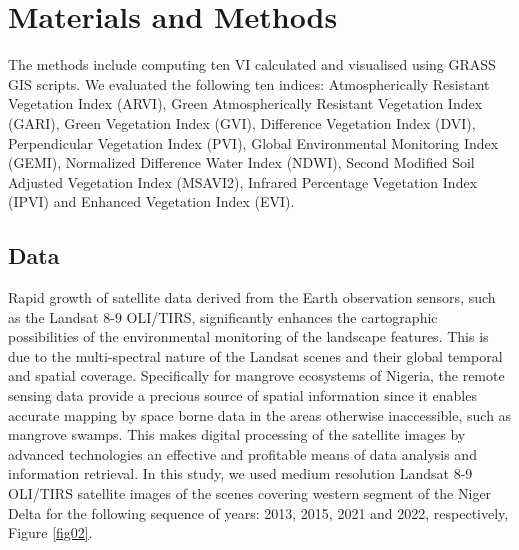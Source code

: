 \documentclass[jmse,article,submit,pdftex,moreauthors]{Definitions/mdpi}
\begin{document}
\section{Materials and Methods}

The methods include computing ten VI calculated and visualised using GRASS GIS scripts. We evaluated the following ten indices: Atmospherically Resistant Vegetation Index (ARVI), Green Atmospherically Resistant Vegetation Index (GARI), Green Vegetation Index (GVI), Difference Vegetation Index (DVI), Perpendicular Vegetation Index (PVI), Global Environmental Monitoring Index (GEMI), Normalized Difference Water Index (NDWI), Second Modified Soil Adjusted Vegetation Index (MSAVI2), Infrared Percentage Vegetation Index (IPVI) and Enhanced Vegetation Index (EVI). 

\subsection{Data}
Rapid growth of satellite data derived from the Earth observation sensors, such as the Landsat 8-9 OLI/TIRS, significantly enhances the cartographic possibilities of the environmental monitoring of the landscape features. This is due to the multi-spectral nature of the Landsat scenes and their global temporal and spatial coverage. Specifically for mangrove ecosystems of Nigeria, the remote sensing data provide a precious source of spatial information since it enables accurate mapping by space borne data in the areas otherwise inaccessible, such as mangrove swamps. This makes digital processing of the satellite images by advanced technologies an effective and profitable means of data analysis  and information retrieval. In this study, we used medium resolution Landsat 8-9 OLI/TIRS satellite images of the scenes covering western segment of the Niger Delta for the following sequence of years: 2013, 2015, 2021 and 2022, respectively, Figure \ref{fig02}. 
\end{document}

